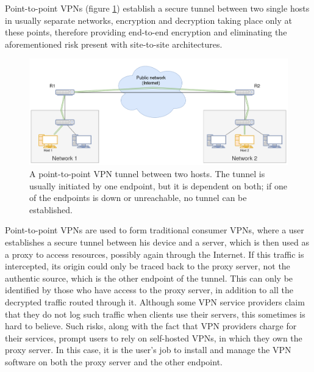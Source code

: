 \documentclass[a4paper,12pt]{report}
\begin{document}
		Point-to-point VPNs (figure \ref{fig:point-to-point_VPN}) establish a secure tunnel between two single hosts in usually separate networks, encryption and decryption taking place only at these points, therefore providing end-to-end encryption and eliminating the aforementioned risk present with site-to-site architectures.
		\begin{figure}[h]
			\includegraphics[width=\textwidth]{point-to-point_VPN}
			\centering
			\caption{A point-to-point VPN tunnel between two hosts. The tunnel is usually initiated by one endpoint, but it is dependent on both; if one of the endpoints is down or unreachable, no tunnel can be established.}
			\label{fig:point-to-point_VPN}
		\end{figure}
		
		Point-to-point VPNs are used to form traditional consumer VPNs, where a user establishes a secure tunnel between his device and a server, which is then used as a proxy to access resources, possibly again through the Internet. If this traffic is intercepted, its origin could only be traced back to the proxy server, not the authentic source, which is the other endpoint of the tunnel. This can only be identified by those who have access to the proxy server, in addition to all the decrypted traffic routed through it. Although some VPN service providers claim that they do not log such traffic when clients use their servers, this sometimes is hard to believe. Such risks, along with the fact that VPN providers charge for their services, prompt users to rely on self-hosted VPNs, in which they own the proxy server. In this case, it is the user's job to install and manage the VPN software on both the proxy server and the other endpoint.
		
\end{document}
